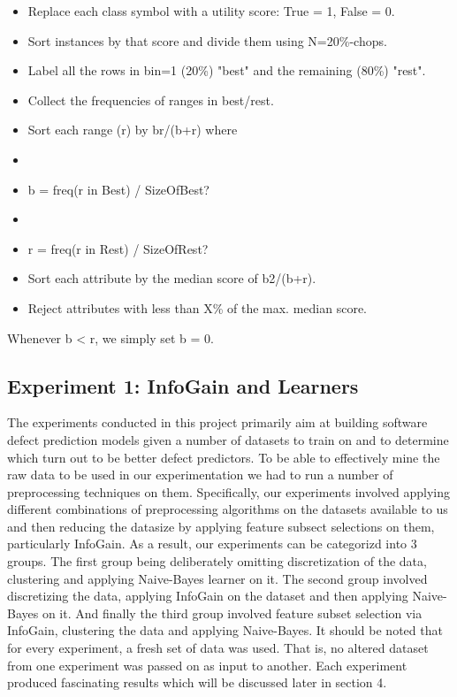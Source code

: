 \documentclass{sig-alternate}
\begin{document}
\begin{itemize}
	\item Replace each class symbol with a utility score: True = 1, False = 0.
    	\item Sort instances by that score and divide them using N=20\%-chops.
    	\item Label all the rows in bin=1 (20\%) "best" and the remaining (80\%) "rest".
    	\item Collect the frequencies of ranges in best/rest.
    	\item Sort each range (r) by b^^2/(b+r) where
          	\item\item b = freq(r in Best) / SizeOfBest?
          	\item\item r = freq(r in Rest) / SizeOfRest?
    	\item Sort each attribute by the median score of b2/(b+r).
    	\item Reject attributes with less than X\% of the max. median score. 
\end{itemize}

Whenever b < r, we simply set b = 0.

\subsection{Experiment 1: InfoGain and Learners}
The experiments conducted in this project primarily aim at building software defect prediction models given a number of datasets to train on and to determine which turn out to be better defect predictors. To be able to effectively mine the raw data to be used in our experimentation we had to run a number of preprocessing techniques on them. Specifically, our experiments involved applying different combinations of preprocessing algorithms on the datasets available to us and then reducing the datasize by applying feature subsect selections on them, particularly InfoGain. As a result, our experiments can be categorizd into 3 groups. The first group being deliberately omitting discretization of the data, clustering and applying Naive-Bayes learner on it. The second group involved discretizing the data, applying InfoGain on the dataset and then applying Naive-Bayes on it. And finally the third group involved feature subset selection via InfoGain, clustering the data and applying Naive-Bayes. It should be noted that for every experiment, a fresh set of data was used. That is, no altered dataset from one experiment was passed on as input to another. Each experiment produced fascinating results which will be discussed later in section 4.
\end{document}
